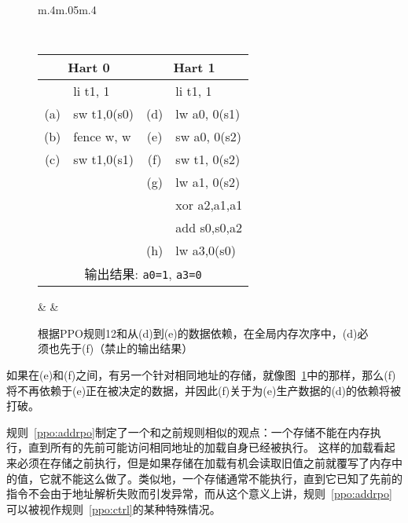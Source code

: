 \begin{figure}[h!]
  \centering
  \begin{tabular}{m{.4\linewidth}m{.05\linewidth}m{.4\linewidth}}
  {
    \tt\small
    \begin{tabular}{cl||cl}
    \multicolumn{2}{c}{Hart 0} & \multicolumn{2}{c}{Hart 1} \\
    \hline
          & li t1, 1    &     & li t1, 1       \\
      (a) & sw t1,0(s0) & (d) & lw a0, 0(s1)   \\
      (b) & fence w, w  & (e) & sw a0, 0(s2)   \\
      (c) & sw t1,0(s1) & (f) & sw t1, 0(s2)   \\
          &             & (g) & lw a1, 0(s2)   \\
          &             &     & xor a2,a1,a1   \\
          &             &     & add s0,s0,a2   \\
          &             & (h) & lw a3,0(s0)    \\   

      \hline
      \multicolumn{4}{c}{输出结果: {\tt a0=1}, {\tt a3=0}}
    \end{tabular}
  } & &
  
  \end{tabular}

  \caption{根据PPO规则12和从(d)到(e)的数据依赖，在全局内存次序中，(d)必须也先于(f)（禁止的输出结果）
    }
  \label{fig:litmus:addrdatarfi_no}
\end{figure}

如果在(e)和(f)之间，有另一个针对相同地址的存储，就像图~\ref{fig:litmus:addrdatarfi_no}中的那样，那么(f)将不再依赖于(e)正在被决定的数据，并因此(f)关于为(e)生产数据的(d)的依赖将被打破。

规则~\ref{ppo:addrpo}制定了一个和之前规则相似的观点：一个存储不能在内存执行，直到所有的先前可能访问相同地址的加载自身已经被执行。
这样的加载看起来必须在存储之前执行，但是如果存储在加载有机会读取旧值之前就覆写了内存中的值，它就不能这么做了。类似地，一个存储通常不能执行，直到它已知了先前的指令不会由于地址解析失败而引发异常，而从这个意义上讲，规则~\ref{ppo:addrpo}可以被视作规则~\ref{ppo:ctrl}的某种特殊情况。

